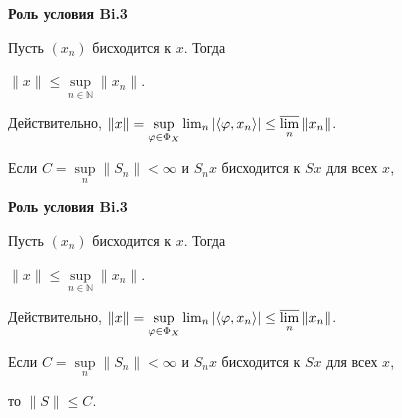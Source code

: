 \documentclass[11pt]{article}
\newcommand{\N}{\mathbb{N}}
\let\ph\varphi
\begin{document}
\newpage

\begin{center}
{\color{notaeYELLOW}\bfseries\fontsize{44}{52}\selectfont Роль условия Bi.3}
\end{center}
\vspace*{\fill}
\begin{center}
\fontsize{36}{43}\selectfont
\parbox{\linewidth}{\centering\noindent Пусть $(x_n)$ бисходится к $x$. Тогда
\par}\vspace{0.4in}
\parbox{\linewidth}{\centering\noindent $\|x\|\le\sup\limits_{n\in\N}\|x_n\|.$
\par}\vspace{0.4in}
\parbox{\linewidth}{\centering\noindent Действительно, $\|x\|=\sup\limits_{\ph\in\Phi_X}\lim_n|\langle\ph,x_n\rangle|\le\varlimsup\limits_n\|x_n\|$.
\par}\vspace{0.4in}
\parbox{\linewidth}{\centering\noindent Если $C=\sup\limits_n\|S_n\|<\infty$ и $S_n x$ бисходится к $Sx$ для всех $x$,
\par}\vspace{0.4in}
\end{center}
\vspace*{\fill}

\newpage

\begin{center}
{\color{notaeYELLOW}\bfseries\fontsize{44}{52}\selectfont Роль условия Bi.3}
\end{center}
\vspace*{\fill}
\begin{center}
\fontsize{36}{43}\selectfont
\parbox{\linewidth}{\centering\noindent Пусть $(x_n)$ бисходится к $x$. Тогда
\par}\vspace{0.4in}
\parbox{\linewidth}{\centering\noindent $\|x\|\le\sup\limits_{n\in\N}\|x_n\|.$
\par}\vspace{0.4in}
\parbox{\linewidth}{\centering\noindent Действительно, $\|x\|=\sup\limits_{\ph\in\Phi_X}\lim_n|\langle\ph,x_n\rangle|\le\varlimsup\limits_n\|x_n\|$.
\par}\vspace{0.4in}
\parbox{\linewidth}{\centering\noindent Если $C=\sup\limits_n\|S_n\|<\infty$ и $S_n x$ бисходится к $Sx$ для всех $x$,
\par}\vspace{0.4in}
\parbox{\linewidth}{\centering\noindent то $\|S\|\le C$.
\par}\vspace{0.4in}
\end{center}
\vspace*{\fill}
\end{document}
